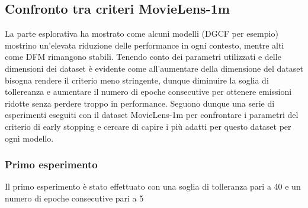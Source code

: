 \subsection{Confronto tra criteri MovieLens-1m}
La parte esplorativa ha mostrato come alcuni modelli (DGCF per esempio) mostrino un'elevata riduzione delle performance in ogni contesto, mentre alti come DFM rimangono stabili.
Tenendo conto dei parametri utilizzati e delle dimensioni dei dataset è evidente come all'aumentare della dimensione del dataset bisogna rendere il criterio meno stringente, dunque diminuire la soglia di tollereanza e aumentare il numero di epoche consecutive per ottenere emissioni ridotte senza perdere troppo in performance.
Seguono dunque una serie di esperimenti eseguiti con il dataset MovieLens-1m per confrontare i parametri del criterio di early stopping e cercare di capire i più adatti per questo dataset per ogni modello.

\subsubsection{Primo esperimento}
Il primo esperimento è stato effettuato con una soglia di tolleranza pari a 40 e un numero di epoche consecutive pari a 5

